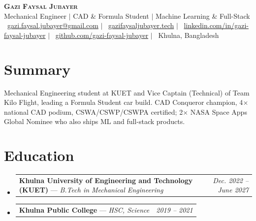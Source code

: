 \documentclass[letterpaper,10pt]{article}
\makeatletter
\newcommand{\resumeSubheading}[4]{
  \vspace{-3pt}\item
    \begin{tabular*}{0.98\textwidth}[t]{l@{\extracolsep{\fill}}r}
      \textbf{#1} \small{--- \textit{#3}} & \textit{\small #4} \\
    \end{tabular*}\vspace{-2pt}
}
\newcommand{\resumeSubHeadingListStart}{\begin{itemize}[leftmargin=0.1in, label={}]}
\newcommand{\resumeSubHeadingListEnd}{\end{itemize}\vspace{-2pt}}
\makeatother
\begin{document}
\begin{center}
    \textbf{\Huge \scshape Gazi Faysal Jubayer} \\ \vspace{2pt}
    \small Mechanical Engineer $|$ CAD \& Formula Student $|$ Machine Learning \& Full-Stack \\ \vspace{1pt}
    \small \faEnvelope\ \href{mailto:gazi.faysal.jubayer@gmail.com}{gazi.faysal.jubayer@gmail.com} $|$
    \faGlobe\ \href{https://gazifaysaljubayer.tech}{gazifaysaljubayer.tech} $|$
    \faLinkedin\ \href{https://www.linkedin.com/in/gazi-faysal-jubayer/}{linkedin.com/in/gazi-faysal-jubayer} $|$
    \faGithub\ \href{https://github.com/gazi-faysal-jubayer}{github.com/gazi-faysal-jubayer} $|$
    \faMapMarker*\ Khulna, Bangladesh
\end{center}
\vspace{-6pt}

\section{Summary}
\small{Mechanical Engineering student at KUET and Vice Captain (Technical) of Team Kilo Flight, leading a Formula Student car build. CAD Conqueror champion, 4$\times$ national CAD podium, CSWA/CSWP/CSWPA certified; 2$\times$ NASA Space Apps Global Nominee who also ships ML and full-stack products.}

\section{Education}
  \resumeSubHeadingListStart
    \resumeSubheading{Khulna University of Engineering and Technology (KUET)}{}{B.Tech in Mechanical Engineering}{Dec. 2022 -- June 2027}
    \resumeSubheading{Khulna Public College}{}{HSC, Science}{2019 -- 2021}
  \resumeSubHeadingListEnd

\end{document}
